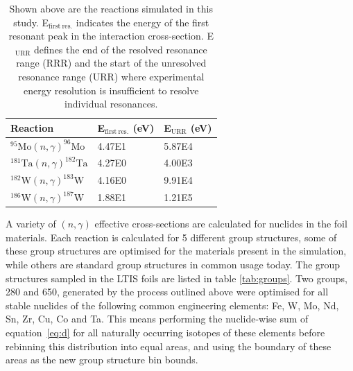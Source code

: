 \begin{table}[H]
  \centering
  \begin{tabular}{lll}
    \toprule
    Reaction                                       & E$_\mathrm{first\ res.}$ (eV) & E$_\mathrm{URR}$ (eV) \\ 
    \midrule
    $^{95}\mathrm{Mo}(n,\gamma)^{96}\mathrm{Mo}$   & 4.47E1                        & 5.87E4                \\
    $^{181}\mathrm{Ta}(n,\gamma)^{182}\mathrm{Ta}$ & 4.27E0                        & 4.00E3                \\
    $^{182}\mathrm{W}(n,\gamma)^{183}\mathrm{W}$   & 4.16E0                        & 9.91E4                \\
    $^{186}\mathrm{W}(n,\gamma)^{187}\mathrm{W}$   & 1.88E1                        & 1.21E5                \\ 
    \bottomrule
  \end{tabular}
  \caption{Shown above are the reactions simulated in this study. E$_\mathrm{first\ res.}$ indicates the energy of the first resonant peak in the interaction cross-section. E$_\mathrm{URR}$ defines the end of the resolved resonance range (RRR) and the start of the unresolved resonance range (URR) where experimental energy resolution is insufficient to resolve individual resonances.}
  \label{tab:reactions}
\end{table}

A variety of $(n,\gamma)$ effective cross-sections are calculated for nuclides in the foil materials. Each reaction is calculated for 5 different group structures, some of these group structures are optimised for the materials present in the simulation, while others are standard group structures in common usage today. The group structures sampled in the LTIS foils are listed in table \ref{tab:groups}. Two groups, 280 and 650, generated by the process outlined above were optimised for all stable nuclides of the following common engineering elements: Fe, W, Mo, Nd, Sn, Zr, Cu, Co and Ta. This means performing the nuclide-wise sum of equation~\ref{eq:d} for all naturally occurring isotopes of these elements before rebinning this distribution into equal areas, and using the boundary of these areas as the new group structure bin bounds.

